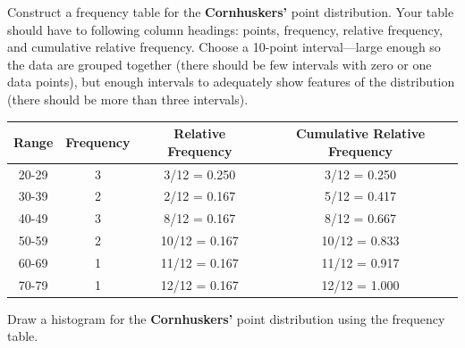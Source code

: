 \documentclass[11pt]{article}\usepackage[]{graphicx}\usepackage[]{color}
\begin{document}
\item Construct a frequency table for the \textbf{Cornhuskers'} point distribution. Your table should have to following column headings: points, frequency, relative frequency, and cumulative relative frequency. Choose a 10-point interval---large enough so the data are grouped together (there should be few intervals with zero or one data points), but enough intervals to adequately show features of the distribution (there should be more than three intervals).

\begin{center}
\begin{tabular}{cccc}\hline
   Range & Frequency & Relative Frequency & Cumulative Relative Frequency \\ \hline 
   20-29 & 3 & 3/12 = 0.250 & 3/12 = 0.250 \\ 
   30-39 & 2 & 2/12 = 0.167 & 5/12 = 0.417 \\ 
   40-49 & 3 & 8/12 = 0.167 & 8/12 = 0.667 \\ 
   50-59 & 2 & 10/12 = 0.167 & 10/12 = 0.833 \\ 
   60-69 & 1 & 11/12 = 0.167 & 11/12 = 0.917 \\ 
   70-79 & 1 & 12/12 = 0.167 & 12/12 = 1.000 \\ \hline
\end{tabular}
\end{center}

\item Draw a histogram for the \textbf{Cornhuskers'} point distribution using the frequency table.
\end{document}
